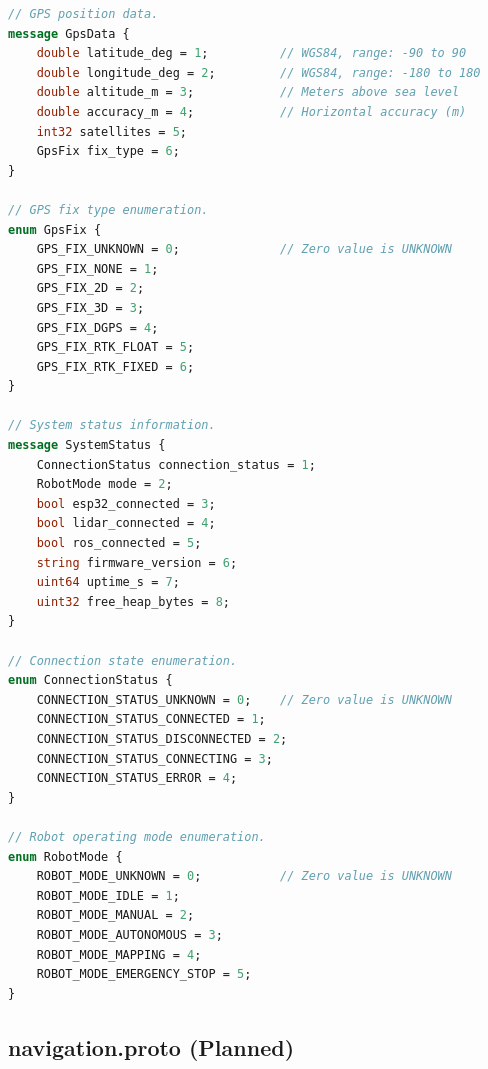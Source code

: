 \begin{lstlisting}[language=Protobuf, caption=star/v1/telemetry.proto]
// GPS position data.
message GpsData {
    double latitude_deg = 1;          // WGS84, range: -90 to 90
    double longitude_deg = 2;         // WGS84, range: -180 to 180
    double altitude_m = 3;            // Meters above sea level
    double accuracy_m = 4;            // Horizontal accuracy (m)
    int32 satellites = 5;
    GpsFix fix_type = 6;
}

// GPS fix type enumeration.
enum GpsFix {
    GPS_FIX_UNKNOWN = 0;              // Zero value is UNKNOWN
    GPS_FIX_NONE = 1;
    GPS_FIX_2D = 2;
    GPS_FIX_3D = 3;
    GPS_FIX_DGPS = 4;
    GPS_FIX_RTK_FLOAT = 5;
    GPS_FIX_RTK_FIXED = 6;
}

// System status information.
message SystemStatus {
    ConnectionStatus connection_status = 1;
    RobotMode mode = 2;
    bool esp32_connected = 3;
    bool lidar_connected = 4;
    bool ros_connected = 5;
    string firmware_version = 6;
    uint64 uptime_s = 7;
    uint32 free_heap_bytes = 8;
}

// Connection state enumeration.
enum ConnectionStatus {
    CONNECTION_STATUS_UNKNOWN = 0;    // Zero value is UNKNOWN
    CONNECTION_STATUS_CONNECTED = 1;
    CONNECTION_STATUS_DISCONNECTED = 2;
    CONNECTION_STATUS_CONNECTING = 3;
    CONNECTION_STATUS_ERROR = 4;
}

// Robot operating mode enumeration.
enum RobotMode {
    ROBOT_MODE_UNKNOWN = 0;           // Zero value is UNKNOWN
    ROBOT_MODE_IDLE = 1;
    ROBOT_MODE_MANUAL = 2;
    ROBOT_MODE_AUTONOMOUS = 3;
    ROBOT_MODE_MAPPING = 4;
    ROBOT_MODE_EMERGENCY_STOP = 5;
}
\end{lstlisting}

\subsection{navigation.proto (Planned)}

